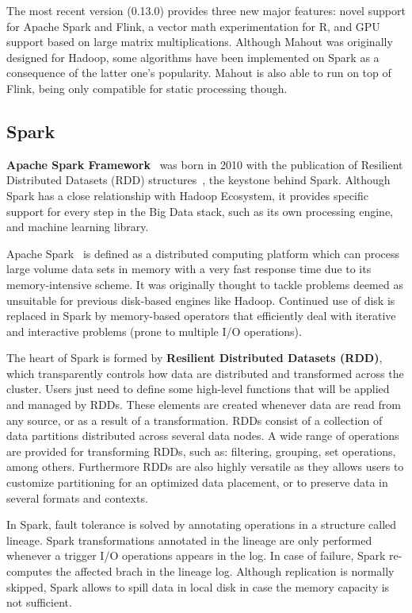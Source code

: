 \documentclass[3p,review]{elsarticle}
\begin{document}
The most recent version (0.13.0) provides three new major features: novel support for Apache Spark and Flink, a vector math experimentation for R, and GPU support based on large matrix multiplications. Although Mahout was originally designed for Hadoop, some algorithms have been implemented on Spark as a consequence of the latter one's popularity. Mahout is also able to run on top of Flink, being only compatible for static processing though.

\subsection{Spark}\label{subsec:spark}

\textbf{Apache Spark Framework}~\cite{spark} was born in 2010 with the publication of Resilient Distributed Datasets (RDD) structures~\cite{zaharia12}, the keystone behind Spark. Although Spark has a close relationship with Hadoop Ecosystem, it provides specific support for every step in the Big Data stack, such as its own processing engine, and machine learning library. 

Apache Spark~\cite{hamstra15} is defined as a distributed computing platform which can process large volume data sets in memory with a very fast response time due to its memory-intensive scheme. It was originally thought to tackle problems deemed as unsuitable for previous disk-based engines like Hadoop. Continued use of disk is replaced in Spark by memory-based operators that efficiently deal with iterative and interactive problems (prone to multiple I/O operations). 

The heart of Spark is formed by \textbf{Resilient Distributed Datasets (RDD)}, which transparently controls how data are distributed and transformed across the cluster. Users just need to define some high-level functions that will be applied and managed by RDDs. These elements are created whenever data are read from any source, or as a result of a transformation. RDDs consist of a collection of data partitions distributed across several data nodes. A wide range of operations are provided for transforming RDDs, such as: filtering, grouping, set operations, among others. Furthermore RDDs are also highly versatile as they allows users to customize partitioning for an optimized data placement, or to preserve data in several formats and contexts.

In Spark, fault tolerance is solved by annotating operations in a structure called lineage. Spark transformations annotated in the lineage are only performed whenever a trigger I/O operations appears in the log. In case of failure, Spark re-computes the affected brach in the lineage log. Although replication is normally skipped, Spark allows to spill data in local disk in case the memory capacity is not sufficient. 
\end{document}
